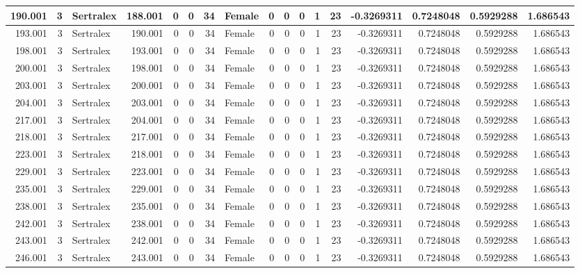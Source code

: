 \documentclass[
]{book}
\begin{document}
\begin{table}
\begin{tabular}[t]{r|r|l|r|r|r|r|l|r|r|r|r|r|r|r|r|r}
\hline
190.001 & 3 & Sertralex & 188.001 & 0 & 0 & 34 & Female & 0 & 0 & 0 & 1 & 23 & -0.3269311 & 0.7248048 & 0.5929288 & 1.686543\\
\hline
193.001 & 3 & Sertralex & 190.001 & 0 & 0 & 34 & Female & 0 & 0 & 0 & 1 & 23 & -0.3269311 & 0.7248048 & 0.5929288 & 1.686543\\
\hline
198.001 & 3 & Sertralex & 193.001 & 0 & 0 & 34 & Female & 0 & 0 & 0 & 1 & 23 & -0.3269311 & 0.7248048 & 0.5929288 & 1.686543\\
\hline
200.001 & 3 & Sertralex & 198.001 & 0 & 0 & 34 & Female & 0 & 0 & 0 & 1 & 23 & -0.3269311 & 0.7248048 & 0.5929288 & 1.686543\\
\hline
203.001 & 3 & Sertralex & 200.001 & 0 & 0 & 34 & Female & 0 & 0 & 0 & 1 & 23 & -0.3269311 & 0.7248048 & 0.5929288 & 1.686543\\
\hline
204.001 & 3 & Sertralex & 203.001 & 0 & 0 & 34 & Female & 0 & 0 & 0 & 1 & 23 & -0.3269311 & 0.7248048 & 0.5929288 & 1.686543\\
\hline
217.001 & 3 & Sertralex & 204.001 & 0 & 0 & 34 & Female & 0 & 0 & 0 & 1 & 23 & -0.3269311 & 0.7248048 & 0.5929288 & 1.686543\\
\hline
218.001 & 3 & Sertralex & 217.001 & 0 & 0 & 34 & Female & 0 & 0 & 0 & 1 & 23 & -0.3269311 & 0.7248048 & 0.5929288 & 1.686543\\
\hline
223.001 & 3 & Sertralex & 218.001 & 0 & 0 & 34 & Female & 0 & 0 & 0 & 1 & 23 & -0.3269311 & 0.7248048 & 0.5929288 & 1.686543\\
\hline
229.001 & 3 & Sertralex & 223.001 & 0 & 0 & 34 & Female & 0 & 0 & 0 & 1 & 23 & -0.3269311 & 0.7248048 & 0.5929288 & 1.686543\\
\hline
235.001 & 3 & Sertralex & 229.001 & 0 & 0 & 34 & Female & 0 & 0 & 0 & 1 & 23 & -0.3269311 & 0.7248048 & 0.5929288 & 1.686543\\
\hline
238.001 & 3 & Sertralex & 235.001 & 0 & 0 & 34 & Female & 0 & 0 & 0 & 1 & 23 & -0.3269311 & 0.7248048 & 0.5929288 & 1.686543\\
\hline
242.001 & 3 & Sertralex & 238.001 & 0 & 0 & 34 & Female & 0 & 0 & 0 & 1 & 23 & -0.3269311 & 0.7248048 & 0.5929288 & 1.686543\\
\hline
243.001 & 3 & Sertralex & 242.001 & 0 & 0 & 34 & Female & 0 & 0 & 0 & 1 & 23 & -0.3269311 & 0.7248048 & 0.5929288 & 1.686543\\
\hline
246.001 & 3 & Sertralex & 243.001 & 0 & 0 & 34 & Female & 0 & 0 & 0 & 1 & 23 & -0.3269311 & 0.7248048 & 0.5929288 & 1.686543\\

\end{tabular}
\end{table}
\end{document}
